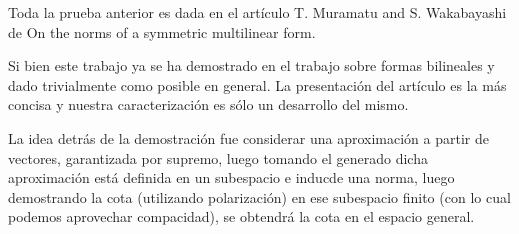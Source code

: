 \begin{rmrk}
	Toda la prueba anterior es dada en el artículo T. Muramatu and S. Wakabayashi de On the norms of a symmetric multilinear form.
	
	Si bien este trabajo ya se ha demostrado en el trabajo sobre formas bilineales y dado trivialmente como posible en general. La presentación del artículo es la más concisa y nuestra caracterización es sólo un desarrollo del mismo.
	
	La idea detrás de la demostración fue considerar una aproximación a partir de vectores, garantizada por supremo, luego tomando el generado dicha aproximación está definida en un subespacio e inducde una norma, luego demostrando la cota (utilizando polarización) en ese subespacio finito (con lo cual podemos aprovechar compacidad), se obtendrá la cota en el espacio general.
\end{rmrk}

